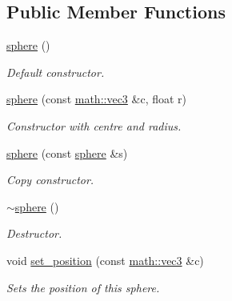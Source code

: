 \subsection*{Public Member Functions}
\begin{DoxyCompactItemize}
\item 
\mbox{\label{classphysim_1_1geom_1_1sphere_abb0158102a424d81d9daf0c29b2e7377}} 
\hyperlink{classphysim_1_1geom_1_1sphere_abb0158102a424d81d9daf0c29b2e7377}{sphere} ()
\begin{DoxyCompactList}\small\item\em Default constructor. \end{DoxyCompactList}\item 
\mbox{\label{classphysim_1_1geom_1_1sphere_acc95c60996eda5faf43083603ead2bb5}} 
\hyperlink{classphysim_1_1geom_1_1sphere_acc95c60996eda5faf43083603ead2bb5}{sphere} (const \hyperlink{structphysim_1_1math_1_1vec3}{math\+::vec3} \&c, float r)
\begin{DoxyCompactList}\small\item\em Constructor with centre and radius. \end{DoxyCompactList}\item 
\mbox{\label{classphysim_1_1geom_1_1sphere_a616483674609c3ea8fb2882c55295cd2}} 
\hyperlink{classphysim_1_1geom_1_1sphere_a616483674609c3ea8fb2882c55295cd2}{sphere} (const \hyperlink{classphysim_1_1geom_1_1sphere}{sphere} \&s)
\begin{DoxyCompactList}\small\item\em Copy constructor. \end{DoxyCompactList}\item 
\mbox{\label{classphysim_1_1geom_1_1sphere_a045a36d149e2c310aa29e6f379791431}} 
\hyperlink{classphysim_1_1geom_1_1sphere_a045a36d149e2c310aa29e6f379791431}{$\sim$sphere} ()
\begin{DoxyCompactList}\small\item\em Destructor. \end{DoxyCompactList}\item 
void \hyperlink{classphysim_1_1geom_1_1sphere_abaedaa499d3fe63f31935e6cd9304446}{set\+\_\+position} (const \hyperlink{structphysim_1_1math_1_1vec3}{math\+::vec3} \&c)
\begin{DoxyCompactList}\small\item\em Sets the position of this sphere. \end{DoxyCompactList}\item 

\end{DoxyCompactItemize}
